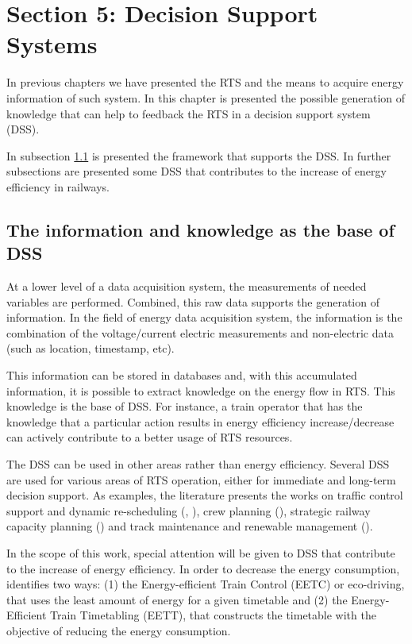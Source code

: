 


\section{Section 5: Decision Support Systems}
In previous chapters we have presented the RTS and the means to acquire energy information of such system.
In this chapter is presented the possible generation of knowledge that can help to feedback the RTS in a decision support system (DSS).

In subsection \ref{subs:351} is presented the framework that supports the DSS. In further subsections are presented some DSS that contributes to the increase of energy efficiency in railways.


\subsection{The information and knowledge as the base of DSS}
\label{subs:351}

	At a lower level of a data acquisition system, the measurements of needed variables are performed. 
	Combined, this raw data supports the generation of information.
	In the field of energy data acquisition system, the information is the combination of the voltage/current electric measurements and non-electric data (such as location, timestamp, etc).
	
	This information can be stored in databases and, with this accumulated information, it is possible to extract knowledge on the energy flow in RTS.
	This knowledge is the base of DSS. For instance, a train operator that has the knowledge that a particular action results in energy efficiency increase/decrease can actively contribute to a better usage of RTS resources.
	
	The DSS can be used in other areas rather than energy efficiency. 	
	Several DSS are used for various areas of RTS operation, either for immediate and long-term decision support.
	As examples, the literature presents the works on traffic control support and dynamic re-scheduling (\cite{dariano2009}, \cite{krasemann2012}), crew planning (\cite{freling2004}), strategic railway capacity planning (\cite{lai2011}) and track maintenance and renewable management (\cite{guler2013}).
	
	
	In the scope of this work, special attention will be given to DSS that contribute to the increase of energy efficiency. In order to decrease the energy consumption, \cite{scheepmaker2017} identifies two ways: (1) the Energy-efficient Train Control (EETC) or eco-driving, that uses the least amount of energy for a given timetable and (2) the Energy-Efficient Train Timetabling (EETT), that constructs the timetable with the objective of reducing the energy consumption.
	

